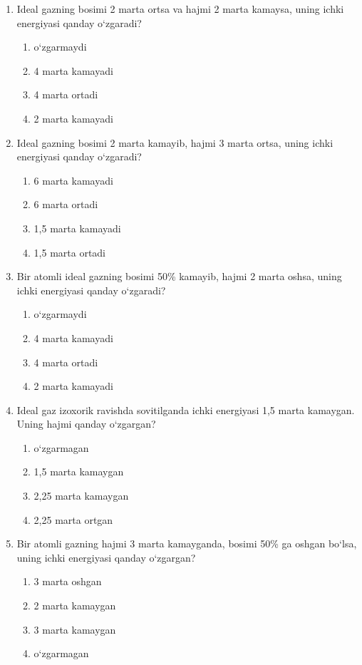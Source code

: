 \begin{enumerate}
\item Ideal gazning bosimi 2 marta ortsa va hajmi 2 marta kamaysa, uning ichki energiyasi qanday o‘zgaradi?
\begin{enumerate}[label=\Alph*)]
\item o‘zgarmaydi
\item 4 marta kamayadi
\item 4 marta ortadi
\item 2 marta kamayadi

\end{enumerate}

\item Ideal gazning bosimi 2 marta kamayib, hajmi 3 marta ortsa, uning ichki energiyasi qanday o‘zgaradi?
\begin{enumerate}[label=\Alph*)]
\item 6 marta kamayadi
\item 6 marta ortadi
\item 1,5 marta kamayadi
\item 1,5 marta ortadi

\end{enumerate}

\item Bir atomli ideal gazning bosimi 50\% kamayib, hajmi 2 marta oshsa, uning ichki energiyasi qanday o‘zgaradi?
\begin{enumerate}[label=\Alph*)]
\item o‘zgarmaydi
\item 4 marta kamayadi
\item 4 marta ortadi
\item 2 marta kamayadi

\end{enumerate}

\item Ideal gaz izoxorik ravishda sovitilganda ichki energiyasi 1,5 marta kamaygan. Uning hajmi qanday o‘zgargan?
\begin{enumerate}[label=\Alph*)]
\item o‘zgarmagan
\item 1,5 marta kamaygan
\item 2,25 marta kamaygan
\item 2,25 marta ortgan

\end{enumerate}

\item Bir atomli gazning hajmi 3 marta kamayganda, bosimi 50\% ga oshgan bo‘lsa, uning ichki energiyasi qanday o‘zgargan?
\begin{enumerate}[label=\Alph*)]
\item 3 marta oshgan
\item 2 marta kamaygan
\item 3 marta kamaygan
\item o‘zgarmagan


\end{enumerate}
\end{enumerate}
